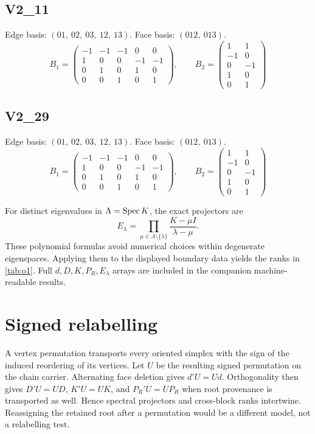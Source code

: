 \subsection*{V2\_11}\label{section:matrices:v2-11}
Edge basis: $(01,\ 02,\ 03,\ 12,\ 13)$.
Face basis: $(012,\ 013)$.
\[
B_1=\left(\begin{matrix}-1 & -1 & -1 & 0 & 0\\1 & 0 & 0 & -1 & -1\\0 & 1 & 0 & 1 & 0\\0 & 0 & 1 & 0 & 1\end{matrix}\right),\qquad B_2=\left(\begin{matrix}1 & 1\\-1 & 0\\0 & -1\\1 & 0\\0 & 1\end{matrix}\right)
\]

\subsection*{V2\_29}\label{section:matrices:v2-29}
Edge basis: $(01,\ 02,\ 03,\ 12,\ 13)$.
Face basis: $(012,\ 013)$.
\[
B_1=\left(\begin{matrix}-1 & -1 & -1 & 0 & 0\\1 & 0 & 0 & -1 & -1\\0 & 1 & 0 & 1 & 0\\0 & 0 & 1 & 0 & 1\end{matrix}\right),\qquad B_2=\left(\begin{matrix}1 & 1\\-1 & 0\\0 & -1\\1 & 0\\0 & 1\end{matrix}\right)
\]

For distinct eigenvalues in $\Lambda=\operatorname{Spec} K$, the exact projectors are
\[
E_\lambda=\prod_{\mu\in\Lambda\setminus\{\lambda\}}
\frac{K-\mu I}{\lambda-\mu}.
\]
These polynomial formulas avoid numerical choices within degenerate eigenspaces. Applying them to the displayed boundary data yields the ranks in \cref{tab:o1}. Full $d,D,K,P_R,E_\lambda$ arrays are included in the companion machine-readable results.

\section{Signed relabelling}\label{section:matrices:signed-relabelling}
A vertex permutation transports every oriented simplex with the sign of the induced reordering of its vertices. Let $U$ be the resulting signed permutation on the chain carrier. Alternating face deletion gives $d'U=Ud$. Orthogonality then gives $D'U=UD$, $K'U=UK$, and $P_R'U=UP_R$ when root provenance is transported as well. Hence spectral projectors and cross-block ranks intertwine. Reassigning the retained root after a permutation would be a different model, not a relabelling test.

